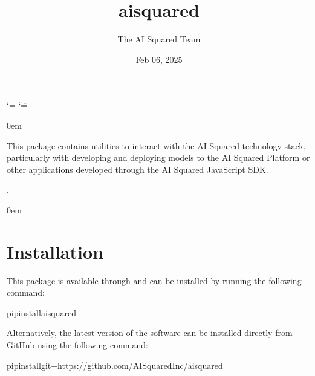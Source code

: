 \documentclass[letterpaper,10pt,english]{sphinxmanual}
\title{aisquared}
\date{Feb 06, 2025}
\author{The AI Squared Team}
\let\sphinxpxdimen\pdfpxdimen\else\newdimen\sphinxpxdimen
\begin{document}
\ifdefined\shorthandoff
  \ifnum\catcode`\=\string=\active\shorthandoff{=}\fi
  \ifnum\catcode`\"=\active{}\fi
\fi

\pagestyle{empty}
\sphinxmaketitle
\pagestyle{plain}
\sphinxtableofcontents
\pagestyle{normal}
\label{\detokenize{index::doc}}
\noindent{\hspace*{\fill}\sphinxincludegraphics[width=400\sphinxpxdimen]{{aisquared}.png}\hspace*{\fill}}

\begin{DUlineblock}{0em}
\item[] 
\item[] 
\end{DUlineblock}



\sphinxAtStartPar
This package contains utilities to interact with the AI Squared technology stack, particularly with developing and deploying models to the AI Squared Platform or other applications developed through the AI Squared JavaScript SDK.

\sphinxAtStartPar
{} 

\sphinxAtStartPar
{}.

\begin{DUlineblock}{0em}
\item[] 
\end{DUlineblock}


\chapter{Installation}
\label{\detokenize{index:installation}}
\sphinxAtStartPar
This package is available through  and can be installed by running the following command:

\begin{sphinxVerbatim}[commandchars=\\\{\}]
pipinstallaisquared
\end{sphinxVerbatim}

\sphinxAtStartPar
Alternatively, the latest version of the software can be installed directly from GitHub using the following command:

\begin{sphinxVerbatim}[commandchars=\\\{\}]
pipinstallgit+https://github.com/AISquaredInc/aisquared
\end{sphinxVerbatim}
\end{document}
